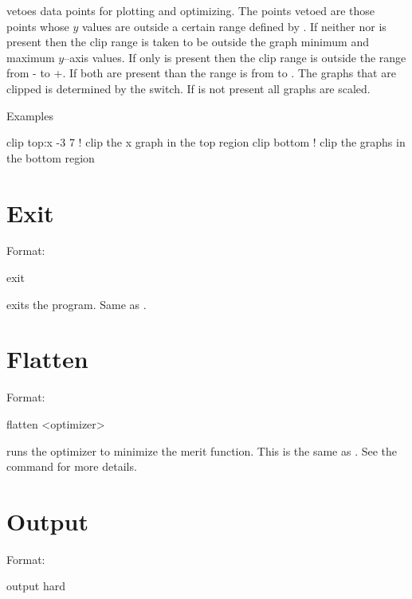 \vskip 0.2in  vetoes data points for plotting and
optimizing. The points vetoed are those points whose $y$ values are
outside a certain range defined by  . If
neither  nor  is present then the clip range
is taken to be outside the graph minimum and maximum $y$--axis
values. If only  is present then the clip range is
outside the range from - to +. If both are
present than the range is from  to .  The
graphs that are clipped is determined by the  switch.  If
 is not present all graphs are scaled.

Examples
\begin{example}
  clip top:x -3  7  ! clip the x graph in the top region
  clip bottom       ! clip the graphs in the bottom region
\end{example}

\section{Exit}
\label{s:exit}

Format:
\begin{example}
  exit
\end{example}

\vskip 0.2in
 exits the program. Same as .

\section{Flatten}
\label{s:flatten}

Format:
\begin{example}
  flatten <optimizer>
\end{example}

\vskip 0.2in
 runs the optimizer to minimize the merit function. This is the 
same as . See the  command for more details.

\section{Output}
\label{s:output}

Format:
\begin{example}
  output hard
\end{example}

